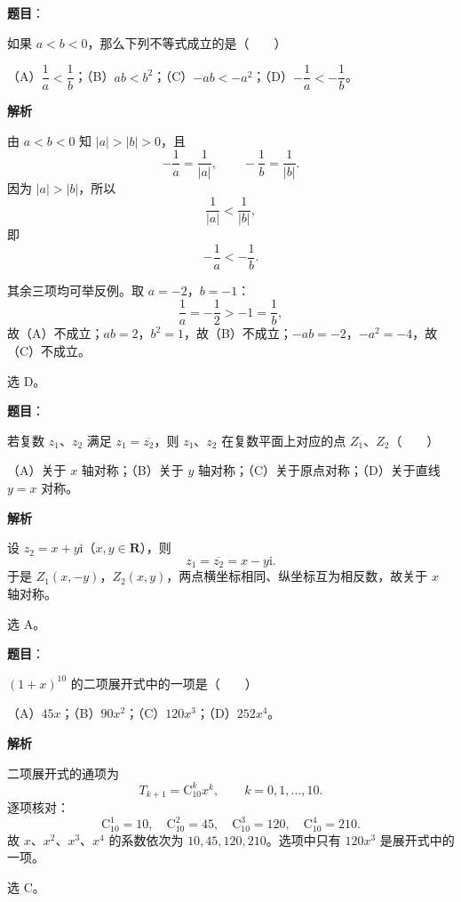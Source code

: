 \begin{answer}

\textbf{题目}：

如果 $a<b<0$，那么下列不等式成立的是\mbox{（　　）}

（A）$\dfrac1a<\dfrac1b$；（B）$ab<b^2$；（C）$-ab<-a^2$；（D）$-\dfrac1a<-\dfrac1b$。

\textbf{解析}

由 $a<b<0$ 知 $|a|>|b|>0$，且
\nopagebreak[4]
\[-\frac1a=\frac1{|a|},\qquad -\frac1b=\frac1{|b|}.\]
因为 $|a|>|b|$，所以
\nopagebreak[4]
\[\frac1{|a|}<\frac1{|b|},\]
即
\nopagebreak[4]
\[-\frac1a<-\frac1b.\]

其余三项均可举反例。取 $a=-2$，$b=-1$：
\nopagebreak[4]
\[\frac1a=-\frac12>-1=\frac1b,\]
故（A）不成立；$ab=2$，$b^2=1$，故（B）不成立；$-ab=-2$，$-a^2=-4$，故（C）不成立。

选 D。


\end{answer}
\begin{answer}

\textbf{题目}：

若复数 $z_1$、$z_2$ 满足 $z_1=\overline{z_2}$，则 $z_1$、$z_2$ 在复数平面上对应的点 $Z_1$、$Z_2$\mbox{（　　）}

（A）关于 $x$ 轴对称；（B）关于 $y$ 轴对称；（C）关于原点对称；（D）关于直线 $y=x$ 对称。

\textbf{解析}

设 $z_2=x+y\mathrm i$（$x,y\in\mathbf R$），则
\nopagebreak[4]
\[z_1=\overline{z_2}=x-y\mathrm i.\]
于是 $Z_1(x,-y)$，$Z_2(x,y)$，两点横坐标相同、纵坐标互为相反数，故关于 $x$ 轴对称。

选 A。


\end{answer}
\begin{answer}

\textbf{题目}：

$(1+x)^{10}$ 的二项展开式中的一项是\mbox{（　　）}

（A）$45x$；（B）$90x^2$；（C）$120x^3$；（D）$252x^4$。

\textbf{解析}

二项展开式的通项为
\nopagebreak[4]
\[T_{k+1}=\mathrm C_{10}^k x^k,\qquad k=0,1,\dots,10.\]
逐项核对：
\nopagebreak[4]
\[\mathrm C_{10}^1=10,\quad
\mathrm C_{10}^2=45,\quad
\mathrm C_{10}^3=120,\quad
\mathrm C_{10}^4=210.\]
故 $x$、$x^2$、$x^3$、$x^4$ 的系数依次为 $10,45,120,210$。选项中只有 $120x^3$ 是展开式中的一项。

选 C。


\end{answer}
